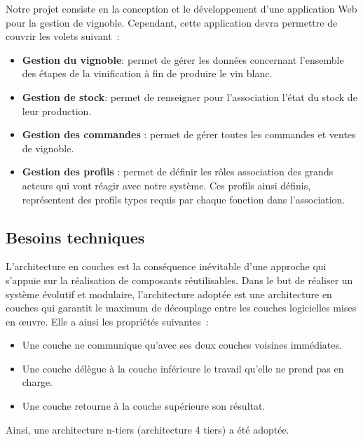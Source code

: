 \documentclass[a4paper, title]{report}
\begin{document}
Notre projet consiste en la conception et le développement d'une
application Web pour la gestion de vignoble. Cependant, cette
application devra permettre de couvrir les volets suivant~: 
\begin{itemize}
\item \textbf{Gestion du vignoble}: permet de gérer les données concernant l'ensemble des étapes
de la vinification à fin de produire le vin blanc.
\item \textbf{Gestion de stock}:
permet de renseigner pour l'association l'état du stock de leur
production.
\item \textbf{Gestion des commandes} : permet de gérer toutes les
commandes et ventes de vignoble.
\item \textbf{Gestion des profils} : permet de
définir les rôles association des grands acteurs qui vont réagir avec
notre système. Ces profils ainsi définis, représentent des profils types
requis par chaque fonction dans l'association.
\end{itemize}

\subsection{Besoins techniques}\label{besoins-techniques}

L'architecture en couches est la conséquence inévitable d'une approche
qui s'appuie sur la réalisation de composants réutilisables. Dans le but
de réaliser un système évolutif et modulaire, l'architecture adoptée est
une architecture en couches qui garantit le maximum de découplage entre
les couches logicielles mises en œuvre. Elle a ainsi les propriétés
suivantes~: 
\begin{itemize}
\item Une couche ne communique qu'avec ses deux couches voisines immédiates. 
\item Une couche délègue à la couche inférieure le travail qu'elle ne prend pas en charge. 
\item Une couche retourne à la couche supérieure son résultat.
\end{itemize}

Ainsi, une architecture n-tiers (architecture 4 tiers) a été adoptée.
\end{document}
